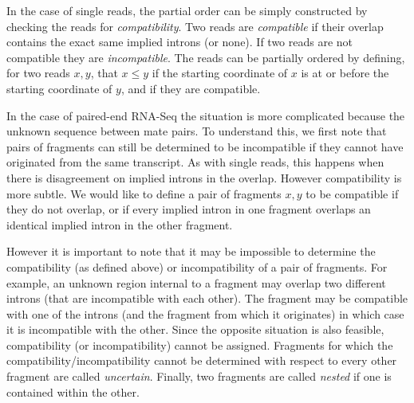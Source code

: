 \documentclass[12pt]{amsart}
\theoremstyle{definition}
\begin{document}
In the case of single reads, the partial order can be simply
constructed by checking the reads for {\em compatibility}. Two reads
are {\em compatible} if their overlap contains the exact same implied
introns (or none). If two reads are not compatible they are {\em
  incompatible}. The reads can be partially ordered by defining, for
two reads $x,y$, that $x\leq y$ if the starting coordinate of $x$ is
at or before the starting coordinate of $y$, and if they are
compatible.

In the case of paired-end RNA-Seq the situation is more complicated
because the unknown sequence between mate pairs. To understand this,
we first note that pairs of fragments can still be determined to be
incompatible if they cannot have originated from the same
transcript. As with single reads, this happens when there is
disagreement on implied introns in the overlap. However compatibility
is more subtle. We would like to define a pair of fragments $x,y$ to
be compatible if they do not overlap, or if every implied intron in one fragment overlaps an identical implied intron in the other fragment. 

However it is important to note that it may be impossible to determine
the compatibility (as defined above) or incompatibility of a pair of fragments. For example, an unknown region internal to a fragment may overlap two different introns (that are incompatible with each other). The fragment may be compatible with one of the introns (and the fragment from which it originates) in which case it is incompatible with the other. Since the opposite situation is also feasible, compatibility (or incompatibility) cannot be assigned. Fragments for which the compatibility/incompatibility cannot be determined with respect to every other fragment are called {\em uncertain}. Finally, two fragments are called {\em nested} if one is contained within the other.
\end{document}
